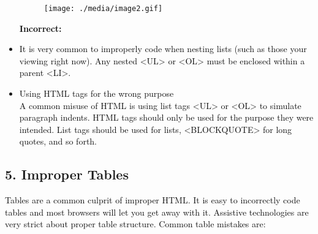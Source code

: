 \documentclass[12pt]{report}
\renewcommand{\_}{\kern-1.5pt\textunderscore\kern-1.5pt}
\begin{document}
\begin{itemize}
\vspace{\baselineskip}


\begin{figure}[H]
	\begin{Center}
		\texttt{[image: ./media/image2.gif]}
	\end{Center}
\end{figure}



\begin{justify}
\textbf{\textcolor[HTML]{0D0D0D}{Incorrect:  \\
}}
\end{justify}\par

\setlength{\parskip}{5.04pt}
	\item \textcolor[HTML]{0D0D0D}{It is very common to improperly code when nesting lists (such as those your viewing right now). Any nested <UL> or <OL> must be enclosed within a parent <LI>.}\par

	\item \textcolor[HTML]{0D0D0D}{Using HTML tags for the wrong purpose\\
A common misuse of HTML is using list tags <UL> or <OL> to simulate paragraph indents. HTML tags should only be used for the purpose they were intended. List tags should be used for lists, <BLOCKQUOTE> for long quotes, and so forth.}
\end{itemize}\par


\vspace{\baselineskip}
\vspace{\baselineskip}\setlength{\parskip}{9.0pt}
\begin{adjustwidth}{0.2in}{0.84in}
\subsection*{5. Improper Tables}
\end{adjustwidth}

\begin{adjustwidth}{0.2in}{0.84in}
\textcolor[HTML]{0D0D0D}{Tables are a common culprit of improper HTML. It is easy to incorrectly code tables and most browsers will let you get away with it. Assistive technologies are very strict about proper table structure. Common table mistakes are:}\par

\end{adjustwidth}
\end{document}

